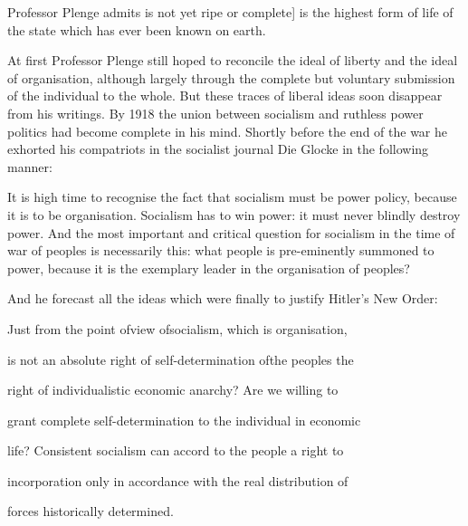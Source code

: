 \documentclass[11pt,openany]{book}
\begin{document}
Professor Plenge admits is not yet ripe or complete] is the highest form of life of the state which has ever been known on earth.

At first Professor Plenge still hoped to reconcile the ideal of liberty and the ideal of organisation, although largely through the complete but voluntary submission of the individual to the whole. But these traces of liberal ideas soon disappear from his writings. By 1918 the union between socialism and ruthless power politics had become complete in his mind. Shortly before the end of the war he exhorted his compatriots in the socialist journal Die Glocke in the following manner:

It is high time to recognise the fact that socialism must be power policy, because it is to be organisation. Socialism has to win power: it must never blindly destroy power. And the most important and critical question for socialism in the time of war of peoples is necessarily this: what people is pre-eminently summoned to power, because it is the exemplary leader in the organisation of peoples?

And he forecast all the ideas which were finally to justify Hitler's New Order:

Just from the point ofview ofsocialism, which is organisation,

is not an absolute right of self-determination ofthe peoples the

right of individualistic economic anarchy? Are we willing to

grant complete self-determination to the individual in economic

life? Consistent socialism can accord to the people a right to

incorporation only in accordance with the real distribution of

forces historically determined.

\begin{center}\textasteriskcentered\hspace{0.9em}\textasteriskcentered\hspace{0.9em}\textasteriskcentered\end{center}

\begin{center}\textasteriskcentered\hspace{0.9em}\textasteriskcentered\hspace{0.9em}\textasteriskcentered\end{center}

\begin{center}\textasteriskcentered\hspace{0.9em}\textasteriskcentered\hspace{0.9em}\textasteriskcentered\end{center}
\end{document}
